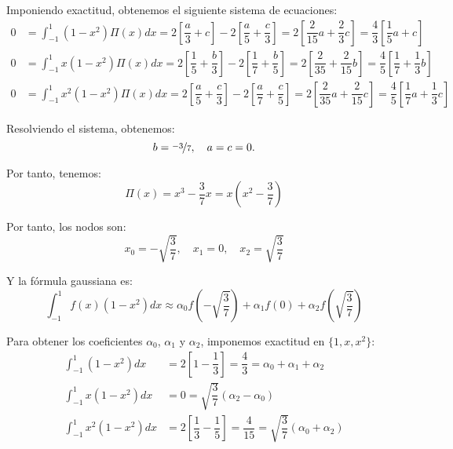 \begin{ejercicio}
\begin{enumerate}
        Imponiendo exactitud, obtenemos el siguiente sistema de ecuaciones:
        \begin{align*}
            0 &= \int_{-1}^{1} (1-x^2)\Pi(x)dx = 2\left[\dfrac{a}{3} + c\right] - 2\left[\dfrac{a}{5} + \dfrac{c}{3}\right]
            = 2\left[\dfrac{2}{15}a + \dfrac{2}{3}c\right] = \dfrac{4}{3}\left[\dfrac{1}{5}a + c\right]\\
            0 &= \int_{-1}^{1} x(1-x^2)\Pi(x)dx = 2\left[\dfrac{1}{5} + \dfrac{b}{3}\right] - 2\left[\dfrac{1}{7} + \dfrac{b}{5}\right]
            = 2\left[\dfrac{2}{35} + \dfrac{2}{15}b\right]
            = \dfrac{4}{5}\left[\dfrac{1}{7} + \dfrac{1}{3}b\right]\\
            0 &= \int_{-1}^{1} x^2(1-x^2)\Pi(x)dx = 2\left[\dfrac{a}{5} + \dfrac{c}{3}\right] - 2\left[\dfrac{a}{7} + \dfrac{c}{5}\right]
            = 2\left[\dfrac{2}{35}a + \dfrac{2}{15}c\right]
            = \dfrac{4}{5}\left[\dfrac{1}{7}a + \dfrac{1}{3}c\right]
        \end{align*}

        Resolviendo el sistema, obtenemos:
        \begin{equation*}
            b=\nicefrac{-3}{7}, \quad a=c=0.
        \end{equation*}

        Por tanto, tenemos:
        \begin{equation*}
            \Pi(x) = x^3 - \frac{3}{7}x = x\left(x^2 - \frac{3}{7}\right)
        \end{equation*}

        Por tanto, los nodos son:
        \begin{equation*}
            x_0 = -\sqrt{\frac{3}{7}}, \quad x_1 = 0, \quad x_2 = \sqrt{\frac{3}{7}}
        \end{equation*}

        Y la fórmula gaussiana es:
        \begin{equation*}
            \int_{-1}^{1} f(x)(1 - x^2)dx \approx \alpha_0 f\left(-\sqrt{\frac{3}{7}}\right) + \alpha_1 f(0) + \alpha_2 f\left(\sqrt{\frac{3}{7}}\right)
        \end{equation*}

        Para obtener los coeficientes $\alpha_0$, $\alpha_1$ y $\alpha_2$, imponemos exactitud en $\{1, x, x^2\}$:
        \begin{align*}
            \int_{-1}^{1} (1 - x^2)dx &= 2\left[1 - \dfrac{1}{3}\right] = \dfrac{4}{3} = \alpha_0 + \alpha_1 + \alpha_2\\
            \int_{-1}^{1} x(1 - x^2)dx &= 0 = \sqrt{\dfrac{3}{7}}\left(\alpha_2 - \alpha_0\right)\\
            \int_{-1}^{1} x^2(1 - x^2)dx &= 2\left[\dfrac{1}{3} - \dfrac{1}{5}\right] = \dfrac{4}{15} = \sqrt{\dfrac{3}{7}}\left(\alpha_0 + \alpha_2\right)
        \end{align*}


\end{enumerate}
\end{ejercicio}
